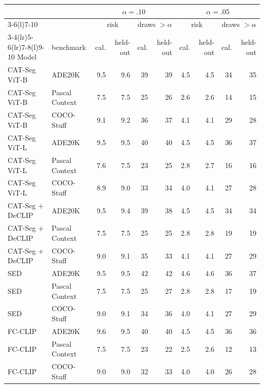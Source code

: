 \begin{tabular}{@{}llrrrrrrrr@{}}
\toprule
& & \multicolumn{4}{c}{$\alpha=.10$} & \multicolumn{4}{c}{$\alpha=.05$} \\
\cmidrule(lr){3-6}\cmidrule(l){7-10}
& & \multicolumn{2}{c}{risk} & \multicolumn{2}{c}{draws $>\alpha$} & \multicolumn{2}{c}{risk} & \multicolumn{2}{c}{draws $>\alpha$} \\
\cmidrule(lr){3-4}\cmidrule(lr){5-6}\cmidrule(lr){7-8}\cmidrule(l){9-10}
Model & benchmark & cal. & held-out & cal. & held-out & cal. & held-out & cal. & held-out \\
\midrule
CAT-Seg ViT-B & ADE20K & 9.5 & 9.6 & 39 & 39 & 4.5 & 4.5 & 34 & 35 \\
CAT-Seg ViT-B & Pascal Context & 7.5 & 7.5 & 25 & 26 & 2.6 & 2.6 & 14 & 15 \\
CAT-Seg ViT-B & COCO-Stuff & 9.1 & 9.2 & 36 & 37 & 4.1 & 4.1 & 29 & 28 \\
CAT-Seg ViT-L & ADE20K & 9.5 & 9.5 & 40 & 40 & 4.5 & 4.5 & 36 & 37 \\
CAT-Seg ViT-L & Pascal Context & 7.6 & 7.5 & 23 & 25 & 2.8 & 2.7 & 16 & 16 \\
CAT-Seg ViT-L & COCO-Stuff & 8.9 & 9.0 & 33 & 34 & 4.0 & 4.1 & 27 & 28 \\
CAT-Seg + DeCLIP & ADE20K & 9.5 & 9.4 & 39 & 38 & 4.5 & 4.5 & 34 & 34 \\
CAT-Seg + DeCLIP & Pascal Context & 7.5 & 7.5 & 25 & 25 & 2.8 & 2.8 & 19 & 19 \\
CAT-Seg + DeCLIP & COCO-Stuff & 9.0 & 9.1 & 35 & 33 & 4.1 & 4.1 & 27 & 29 \\
SED & ADE20K & 9.5 & 9.5 & 42 & 42 & 4.6 & 4.6 & 36 & 37 \\
SED & Pascal Context & 7.5 & 7.5 & 25 & 27 & 2.8 & 2.8 & 17 & 19 \\
SED & COCO-Stuff & 9.0 & 9.1 & 34 & 36 & 4.0 & 4.1 & 27 & 29 \\
FC-CLIP & ADE20K & 9.6 & 9.5 & 40 & 40 & 4.5 & 4.5 & 36 & 36 \\
FC-CLIP & Pascal Context & 7.5 & 7.5 & 23 & 22 & 2.5 & 2.6 & 12 & 13 \\
FC-CLIP & COCO-Stuff & 9.0 & 9.0 & 32 & 33 & 4.0 & 4.0 & 26 & 28 \\
\bottomrule
\end{tabular}
